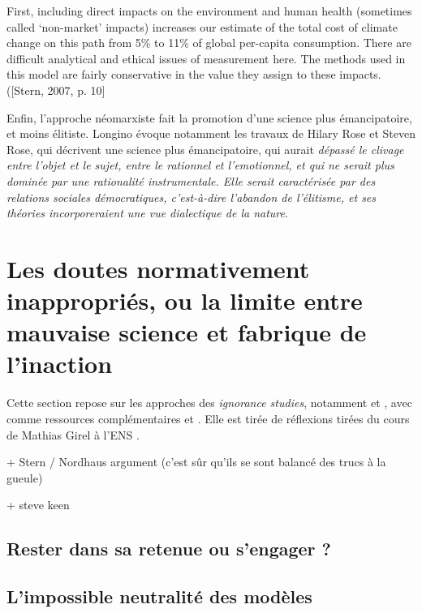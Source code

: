 \begin{displayquote}
    First, including direct impacts on the environment and human health (sometimes called ‘non-market’ impacts) increases our estimate of the total cost of climate change on this path from 5\% to 11\% of global per-capita consumption. There are difficult analytical and ethical issues of measurement here. The methods used in this model are fairly conservative in the value they assign to these impacts.  ([Stern, 2007, p. 10]
\end{displayquote}

Enfin, l'approche néomarxiste fait la promotion d'une science plus émancipatoire, et moins élitiste. Longino évoque notamment les travaux de Hilary Rose et Steven Rose, qui décrivent une science plus émancipatoire, qui aurait \emph{dépassé le clivage entre l'objet et le sujet, entre le rationnel et l'emotionnel, et qui ne serait plus dominée par une rationalité instrumentale. Elle serait caractérisée par des relations sociales démocratiques, c'est-à-dire l'abandon de l'élitisme, et ses théories incorporeraient une vue dialectique de la nature}.



\section{Les doutes normativement inappropriés, ou la limite entre mauvaise science et fabrique de l'inaction}

Cette section repose sur les approches des \textit{ignorance studies}, notamment \cite{melo-martin_fight_2018} et \cite{gross_routledge_2015}, avec comme ressources complémentaires \cite{noauthor_carnet_2024} et \cite{proctor_agnotology_2008}. Elle est tirée de réflexions tirées du cours de Mathias Girel à l'ENS \cite{girel_vertus_2023}. 



+ Stern / Nordhaus argument (c'est sûr qu'ils se sont balancé des trucs à la gueule) 

+ steve keen \cite{keen_appallingly_2021}

\subsection{Rester dans sa retenue ou s'engager ?}

\subsection{L'impossible neutralité des modèles}


